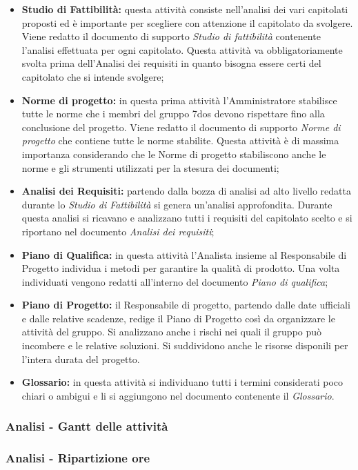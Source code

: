 \begin{itemize}

	\item \textbf{Studio di Fattibilità:} questa attività consiste nell'analisi dei vari capitolati proposti ed è importante per scegliere con attenzione il capitolato da svolgere. Viene redatto il documento di supporto \textit{Studio di fattibilità} contenente l'analisi effettuata per ogni capitolato. Questa attività va obbligatoriamente svolta prima dell'Analisi dei requisiti in quanto bisogna essere certi del capitolato che si intende svolgere;

	\item \textbf{Norme di progetto:} in questa prima attività l'Amministratore stabilisce tutte le norme che i membri del gruppo 7dos devono rispettare fino alla conclusione del progetto. Viene redatto il documento di supporto \textit{Norme di progetto} che contiene tutte le norme stabilite. Questa attività è di massima importanza considerando che le Norme di progetto stabiliscono anche le norme e gli strumenti utilizzati per la stesura dei documenti;

	\item \textbf{Analisi dei Requisiti:} partendo dalla bozza di analisi ad alto livello redatta durante lo \textit{Studio di Fattibilità} si genera un'analisi approfondita. Durante questa analisi si ricavano e analizzano tutti i requisiti del capitolato scelto e si riportano nel documento \textit{Analisi dei requisiti};

	\item \textbf{Piano di Qualifica:} in questa attività l'Analista insieme al Responsabile di Progetto individua i metodi per garantire la qualità di prodotto. Una volta individuati vengono redatti all'interno del documento \textit{Piano di qualifica};

	\item \textbf{Piano di Progetto:} il Responsabile di progetto, partendo dalle date ufficiali e dalle relative scadenze, redige il Piano di Progetto così da organizzare le attività del gruppo. Si analizzano anche i rischi nei quali il gruppo può incombere e le relative soluzioni. Si suddividono anche le risorse disponili per l'intera durata del progetto.

	\item \textbf{Glossario:} in questa attività si individuano tutti i termini considerati poco chiari o ambigui e li si aggiungono nel documento contenente il \textit{Glossario}.

\end{itemize}

\subsubsection{Analisi - Gantt delle attività}

\subsubsection{Analisi - Ripartizione ore}

\pagebreak
